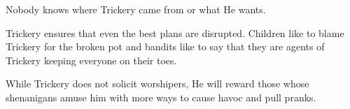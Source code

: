 Nobody knows where Trickery came from or what He wants.

Trickery ensures that even the best plans are disrupted.
Children like to blame Trickery for the broken pot and bandits like to say that they are agents of Trickery keeping everyone on their toes.

While Trickery does not solicit worshipers, He will reward those whose shenanigans amuse him with more ways to cause havoc and pull pranks.
